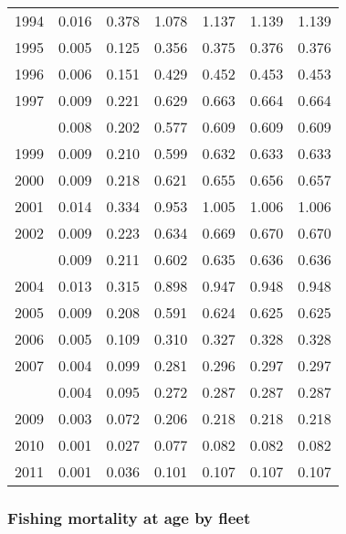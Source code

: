 \documentclass[
]{article}
\begin{document}
\begin{longtable}[t]{lrrrrrr}
1994 & 0.016 & 0.378 & 1.078 & 1.137 & 1.139 & 1.139\\
1995 & 0.005 & 0.125 & 0.356 & 0.375 & 0.376 & 0.376\\
1996 & 0.006 & 0.151 & 0.429 & 0.452 & 0.453 & 0.453\\
1997 & 0.009 & 0.221 & 0.629 & 0.663 & 0.664 & 0.664\\
\addlinespace
1998 & 0.008 & 0.202 & 0.577 & 0.609 & 0.609 & 0.609\\
1999 & 0.009 & 0.210 & 0.599 & 0.632 & 0.633 & 0.633\\
2000 & 0.009 & 0.218 & 0.621 & 0.655 & 0.656 & 0.657\\
2001 & 0.014 & 0.334 & 0.953 & 1.005 & 1.006 & 1.006\\
2002 & 0.009 & 0.223 & 0.634 & 0.669 & 0.670 & 0.670\\
\addlinespace
2003 & 0.009 & 0.211 & 0.602 & 0.635 & 0.636 & 0.636\\
2004 & 0.013 & 0.315 & 0.898 & 0.947 & 0.948 & 0.948\\
2005 & 0.009 & 0.208 & 0.591 & 0.624 & 0.625 & 0.625\\
2006 & 0.005 & 0.109 & 0.310 & 0.327 & 0.328 & 0.328\\
2007 & 0.004 & 0.099 & 0.281 & 0.296 & 0.297 & 0.297\\
\addlinespace
2008 & 0.004 & 0.095 & 0.272 & 0.287 & 0.287 & 0.287\\
2009 & 0.003 & 0.072 & 0.206 & 0.218 & 0.218 & 0.218\\
2010 & 0.001 & 0.027 & 0.077 & 0.082 & 0.082 & 0.082\\
2011 & 0.001 & 0.036 & 0.101 & 0.107 & 0.107 & 0.107\\*
\end{longtable}

\subsubsection{Fishing mortality at age by
fleet}\label{fishing-mortality-at-age-by-fleet}
\end{document}
